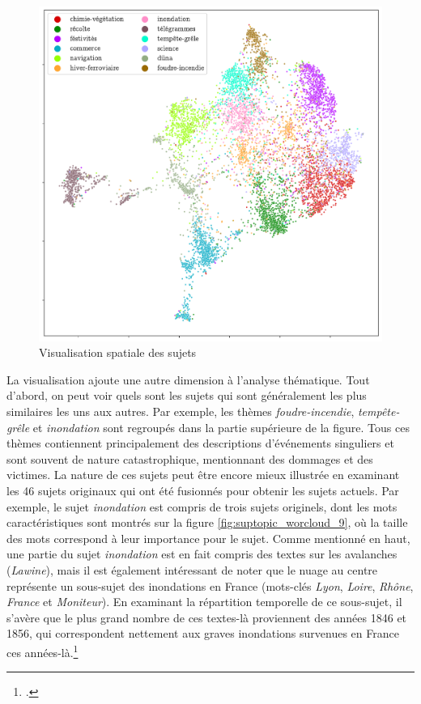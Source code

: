 \documentclass[a4paper,twoside,12pt]{article}
\begin{document}
\begin{figure}[h]
    \centering
    \includegraphics[width=\textwidth]{images/topics_umap.pdf}
    \caption{Visualisation spatiale des sujets}
    \label{fig:topic_umap}
\end{figure}

La visualisation ajoute une autre dimension à l'analyse thématique. Tout d'abord, on peut voir quels sont les sujets qui sont généralement les plus similaires les uns aux autres. Par exemple, les thèmes \textit{foudre-incendie}, \textit{tempête-grêle} et \textit{inondation} sont regroupés dans la partie supérieure de la figure. Tous ces thèmes contiennent principalement des descriptions d'événements singuliers et sont souvent de nature catastrophique, mentionnant des dommages et des victimes. La nature de ces sujets peut être encore mieux illustrée en examinant les 46 sujets originaux qui ont été fusionnés pour obtenir les sujets actuels. Par exemple, le sujet \textit{inondation} est compris de trois sujets originels, dont les mots caractéristiques sont montrés sur la figure \ref{fig:suptopic_worcloud_9}, où la taille des mots correspond à leur importance pour le sujet. Comme mentionné en haut, une partie du sujet \textit{inondation} est en fait compris des textes sur les avalanches (\textit{Lawine}), mais il est également intéressant de noter que le nuage au centre représente un sous-sujet des inondations en France (mots-clés \textit{Lyon}, \textit{Loire}, \textit{Rhône}, \textit{France} et \textit{Moniteur}). En examinant la répartition temporelle de ce sous-sujet, il s'avère que le plus grand nombre de ces textes-là proviennent des années 1846 et 1856, qui correspondent nettement aux graves inondations survenues en France ces années-là.\footcite{coeur_les_2004}
\end{document}
